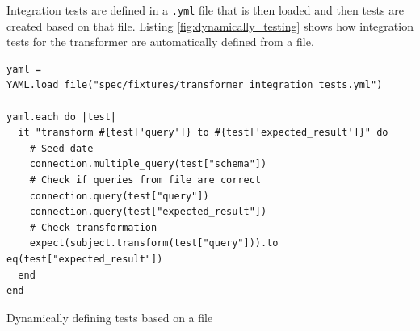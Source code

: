 Integration tests are defined in a \texttt{.yml} file that is then loaded and then tests are created based on that file. Listing \ref{fig:dynamically_testing} shows how integration tests for the transformer are automatically defined from a file.

\begin{listing}
\begin{verbatim}
yaml = YAML.load_file("spec/fixtures/transformer_integration_tests.yml")

yaml.each do |test|
  it "transform #{test['query']} to #{test['expected_result']}" do
    # Seed date
    connection.multiple_query(test["schema"])
    # Check if queries from file are correct
    connection.query(test["query"])
    connection.query(test["expected_result"])
    # Check transformation
    expect(subject.transform(test["query"])).to eq(test["expected_result"])
  end
end
\end{verbatim}
\caption{Dynamically defining tests based on a file}
\label{fig:dynamically_testing}
\end{listing}